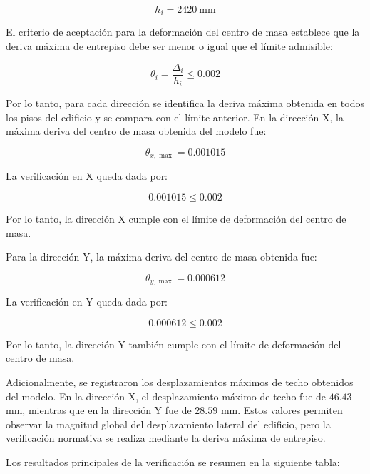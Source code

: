\begin{equation}
h_i = 2420 \ \text{mm}
\end{equation}

El criterio de aceptación para la deformación del centro de masa establece que la deriva máxima de entrepiso debe ser menor o igual que el límite admisible:

\begin{equation}
\theta_i = \frac{\Delta_i}{h_i} \leq 0.002
\end{equation}

Por lo tanto, para cada dirección se identifica la deriva máxima obtenida en todos los pisos del edificio y se compara con el límite anterior. En la dirección X, la máxima deriva del centro de masa obtenida del modelo fue:

\begin{equation}
\theta_{x,\max} = 0.001015
\end{equation}

La verificación en X queda dada por:

\begin{equation}
0.001015 \leq 0.002
\end{equation}

Por lo tanto, la dirección X cumple con el límite de deformación del centro de masa.

Para la dirección Y, la máxima deriva del centro de masa obtenida fue:

\begin{equation}
\theta_{y,\max} = 0.000612
\end{equation}

La verificación en Y queda dada por:

\begin{equation}
0.000612 \leq 0.002
\end{equation}

Por lo tanto, la dirección Y también cumple con el límite de deformación del centro de masa.

Adicionalmente, se registraron los desplazamientos máximos de techo obtenidos del modelo. En la dirección X, el desplazamiento máximo de techo fue de $46.43$ mm, mientras que en la dirección Y fue de $28.59$ mm. Estos valores permiten observar la magnitud global del desplazamiento lateral del edificio, pero la verificación normativa se realiza mediante la deriva máxima de entrepiso.

Los resultados principales de la verificación se resumen en la siguiente tabla:

